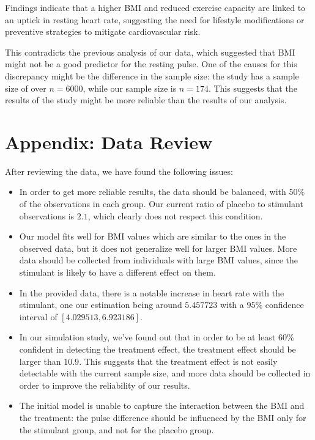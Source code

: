 \documentclass[10pt, a4paper]{article}
\begin{document}
Findings indicate that a higher BMI and reduced exercise capacity are linked to an uptick in resting heart rate, suggesting the need for lifestyle modifications or preventive strategies to mitigate cardiovascular risk.

This contradicts the previous analysis of our data, which suggested that BMI might not be a good predictor for the resting pulse. One of the causes for this discrepancy might be the difference in the sample size: the study has a sample size of over $n = 6000$, while our sample size is $n = 174$. This suggests that the results of the study might be more reliable than the results of our analysis.

\appendix
\section{Appendix: Data Review}

After reviewing the data, we have found the following issues:

\begin{itemize}
  \item In order to get more reliable results, the data should be balanced, with $50 \%$ of the observations in each group. Our current ratio of placebo to stimulant observations is $2.1$, which clearly does not respect this condition.
  \item Our model fits well for BMI values which are similar to the ones in the observed data, but it does not generalize well for larger BMI values. More data should be collected from individuals with large BMI values, since the stimulant is likely to have a different effect on them.
  \item In the provided data, there is a notable increase in heart rate with the stimulant, one our estimation being around $5.457723$ with a $95 \%$ confidence interval of $[4.029513, 6.923186]$.
  \item In our simulation study, we've found out that in order to be at least $60 \%$ confident in detecting the treatment effect, the treatment effect should be larger than $10.9$. This suggests that the treatment effect is not easily detectable with the current sample size, and more data should be collected in order to improve the reliability of our results.
  \item The initial model is unable to capture the interaction between the BMI and the treatment: the pulse difference should be influenced by the BMI only for the stimulant group, and not for the placebo group.
\end{itemize}

\newpage


\end{document}
